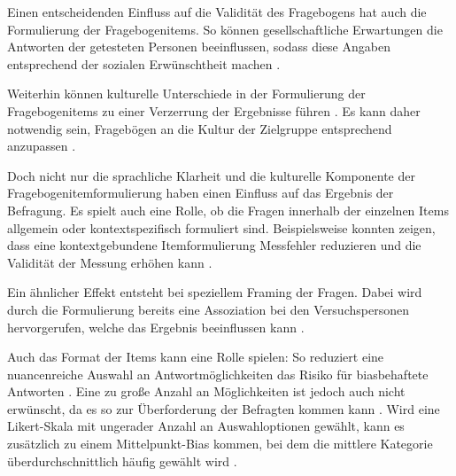 Einen entscheidenden Einfluss auf die Validität des Fragebogens hat auch die Formulierung der Fragebogenitems.
So können gesellschaftliche Erwartungen die Antworten der getesteten Personen beeinflussen, sodass diese Angaben entsprechend der sozialen Erwünschtheit machen \citep{kemper2012kurzskala, kaminski2017situational}.

Weiterhin können kulturelle Unterschiede in der Formulierung der Fragebogenitems zu einer Verzerrung der Ergebnisse führen \citep{harzing2013challenges}.
Es kann daher notwendig sein, Fragebögen an die Kultur der Zielgruppe entsprechend anzupassen \citep{poortinga2013umgang}.

Doch nicht nur die sprachliche Klarheit und die kulturelle Komponente der Fragebogenitemformulierung haben einen Einfluss auf das Ergebnis der Befragung.
Es spielt auch eine Rolle, ob die Fragen innerhalb der einzelnen Items allgemein oder kontextspezifisch formuliert sind.
Beispielsweise konnten  zeigen, dass eine kontextgebundene Itemformulierung Messfehler reduzieren und die Validität der Messung erhöhen kann \citep{bing2004incremental}.

Ein ähnlicher Effekt entsteht bei speziellem Framing der Fragen.
Dabei wird durch die Formulierung bereits eine Assoziation bei den Versuchspersonen hervorgerufen, welche das Ergebnis beeinflussen kann \citep{guyatt1999effect}.

Auch das Format der Items kann eine Rolle spielen:
So reduziert eine nuancenreiche Auswahl an Antwortmöglichkeiten das Risiko für biasbehaftete Antworten \citep{elson2017question}.
Eine zu große Anzahl an Möglichkeiten ist jedoch auch nicht erwünscht, da es so zur Überforderung der Befragten kommen kann \citep{knutsen2010question}.
Wird eine Likert-Skala mit ungerader Anzahl an Auswahloptionen gewählt, kann es zusätzlich zu einem Mittelpunkt-Bias kommen, bei dem die mittlere Kategorie überdurchschnittlich häufig gewählt wird \citep{kulas2009middle}.